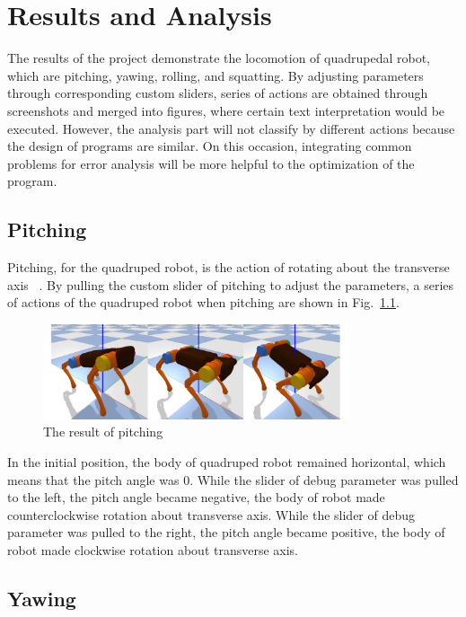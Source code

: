 \chapter{Results and Analysis}

The results of the project demonstrate the locomotion of quadrupedal robot, which are pitching, yawing, rolling, and squatting. By adjusting parameters through corresponding custom sliders, series of actions are obtained through screenshots and merged into figures, where certain text interpretation would be executed. However, the analysis part will not classify by different actions because the design of programs are similar. On this occasion, integrating common problems for error analysis will be more helpful to the optimization of the program.


\section{Pitching}

Pitching, for the quadruped robot, is the action of rotating about the transverse axis ~\cite{ref:sixDOF}. By pulling the custom slider of pitching to adjust the parameters, a series of actions of the quadruped robot when pitching are shown in Fig.~\ref{fig:pitching}.

\begin{figure}[htbp]
    \centering
    \includegraphics[width=0.8\textwidth]{figures/pitching.png}
    \caption{The result of pitching}
    \label{fig:pitching}
\end{figure}

In the initial position, the body of quadruped robot remained horizontal, which means that the pitch angle was 0. While the slider of debug parameter was pulled to the left, the pitch angle became negative, the body of robot made counterclockwise rotation about transverse axis. While the slider of debug parameter was pulled to the right, the pitch angle became positive, the body of robot made clockwise rotation about transverse axis.


\section{Yawing}

